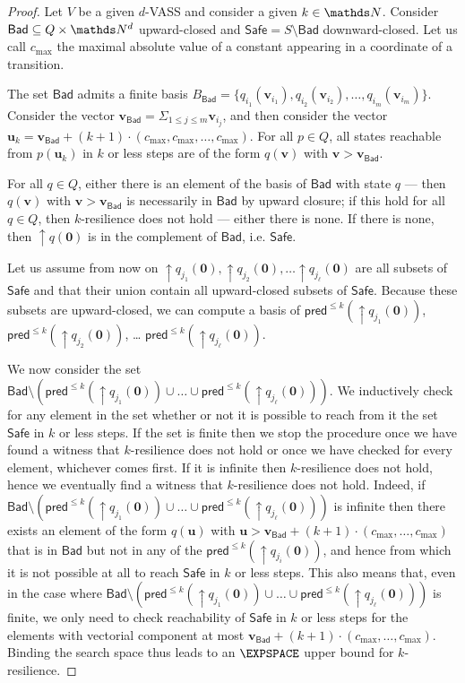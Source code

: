 \documentclass[runningheads]{llncs}
\newcommand{\pred}{\textsf{pred}}
\newcommand{\Bad}{\textsf{Bad}}
\newcommand{\Safe}{\textsf{Safe}}
\begin{document}
\begin{proof}
Let $V$ be a given $d$-VASS and consider a given $k \in \N$.
Consider $\Bad \subseteq Q \times \N^d$ upward-closed and 
$\Safe = S \setminus \Bad$
 downward-closed.
Let us call $c_{\max}$ the maximal absolute value of a constant appearing in a coordinate of a transition.

The set $\Bad$ admits a finite basis 
$B_\Bad = \{ q_{i_1}(\textbf{v}_{i_1}), q_{i_2}(\textbf{v}_{i_2}), \ldots,
q_{i_m}(\textbf{v}_{i_m}) \}$.
Consider the vector $\textbf{v}_{\Bad} = \Sigma_{1 \leq j \leq m} \textbf{v}_{i_j}$,
and then consider the vector
$\textbf{u}_k = \textbf{v}_{\Bad} + (k+1) \cdot (c_{\max}, c_{\max}, \ldots, c_{\max})$.
For all $p \in Q$, all states reachable from $p(\textbf{u}_k)$ in $k$ or less steps are 
of the form $q(\textbf{v})$ with $ \textbf{v} > \textbf{v}_{\Bad}$.

For all $q \in Q$, either there is an element of the basis of $\Bad$ with state $q$ \----
then $q(\textbf{v})$ with $\textbf{v} > \textbf{v}_{\Bad}$ is necessarily in $\Bad$ by upward closure; if this hold for all $q \in Q$, then $k$-resilience does not hold \---- either there is none. If there is none, then 
$\uparrow q(\textbf{0})$
 is in the complement of $\Bad$, i.e. $\Safe$.

Let us assume from now on 
 $\uparrow q_{j_1}(\textbf{0}), \uparrow q_{j_2}(\textbf{0}), \ldots \uparrow q_{j_\ell}(\textbf{0})$ are
all subsets of $\Safe$ and that their union contain all upward-closed subsets of $\Safe$.
Because these subsets are upward-closed, we can compute a basis of
$\pred^{\leq k}(\uparrow q_{j_1}(\textbf{0}))$, $\pred^{\leq k}(\uparrow q_{j_2}(\textbf{0}))$, \ldots
$\pred^{\leq k}(\uparrow q_{j_\ell}(\textbf{0}))$.


We now consider the set 
$\Bad \setminus (\pred^{\leq k}(\uparrow q_{j_1}(\textbf{0})) \cup \ldots \cup \pred^{\leq k}(\uparrow q_{j_\ell}(\textbf{0})) )$.
We inductively check for any element in the set whether or not it is possible to reach from it the set $\Safe$ in $k$ or less steps.
If the set is finite then we stop the procedure once we have found a witness that $k$-resilience does not hold or once we have checked for every element, whichever comes first.
If it is infinite then
$k$-resilience does not hold, 
hence we eventually find a witness that $k$-resilience does not hold.
Indeed, 
if
$\Bad \setminus (\pred^{\leq k}(\uparrow q_{j_1}(\textbf{0})) \cup \ldots \cup \pred^{\leq k}(\uparrow q_{j_\ell}(\textbf{0})) )$
is
infinite
then
there exists an element of the form $q(\textbf{u} )$
with $\textbf{u} > \textbf{v}_{\Bad} + (k+1) \cdot (c_{\max}, \ldots, c_{\max})$ 
that is in $\Bad$ but not in any of the $\pred^{\leq k}(\uparrow q_{j_i}(\textbf{0}))$,
and hence from which it is not possible at all to reach
$\Safe$ in $k$ or less steps. This also means that, even in the case where $\Bad \setminus (\pred^{\leq k}(\uparrow q_{j_1}(\textbf{0})) \cup \ldots \cup \pred^{\leq k}(\uparrow q_{j_\ell}(\textbf{0})) )$ is finite, we only need to check reachability of $\Safe$ in $k$ or less steps for the elements with vectorial component at most
$ \textbf{v}_{\Bad} + (k+1) \cdot (c_{\max}, \ldots, c_{\max})$. Binding the search space
thus leads to an $\EXPSPACE$ upper bound for {\sc $k$-resilience}.



\end{proof}
\end{document}
